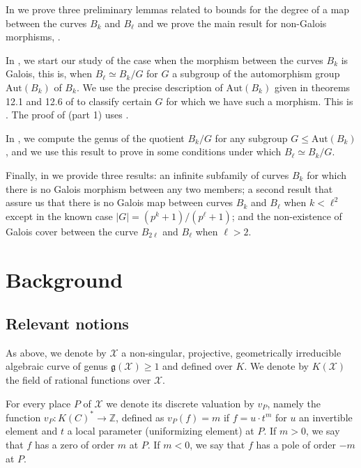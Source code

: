 \documentclass[oneside,a4paper,12pt]{article}
\newcommand{\Z}{{\mathbb{Z}}} %
\theoremstyle{plain} %
\theoremstyle{definition} %
\newcommand{\Aut}{\mathrm{Aut}}
\begin{document}
In  we prove three preliminary lemmas related to bounds for the degree of a map between the curves $B_k$ and $B_\ell$ and we prove the main result for non-Galois morphisms,  .

In , we start our study of the case when the morphism between the curves $B_k$ is Galois, this is, when $B_\ell \simeq B_k/G$ for $G$ a subgroup of the automorphism group $\Aut(B_k)$ of $B_k$.
We use the precise description of $\Aut(B_k)$ given in theorems 12.1 and 12.6 of \cite{HKT}  to classify certain $G$ for which we have such a morphism. 
This is  .
The proof of  (part 1) uses .

In , we compute the genus of the quotient $B_k/G$ for any subgroup $G\leq \Aut(B_k)$, and we use this result to prove in  some conditions under which $B_\ell \simeq B_k/G$. 

Finally, in  we provide three results: an infinite subfamily of curves $B_k$ for which there is no Galois morphism between any two members; a second result that assure us that there is no Galois map between curves $B_k$ and $B_\ell$ when $k< \ell^2$ except in the known case $|G|=(p^k+1)/(p^\ell+1)$; and the non-existence of Galois cover between the curve $B_{2\ell}$ and $B_\ell$ when $\ell>2$.



\section{Background}\label{backg}

\subsection{Relevant notions}
As above, we denote by $\mathcal{X}$ a non-singular, projective, geometrically irreducible algebraic curve of genus $\mathfrak{g}(\mathcal{X})\geq 1$ and defined over $K$.
We denote by $K(\mathcal{X})$ the field of rational functions over $\mathcal{X}$.

For every place $P$ of $\mathcal{X}$ we denote its discrete valuation by $v_P$, namely the function $v_P: K(C)^* \longrightarrow \Z$, defined as $v_P(f)=m$ if $f= u \cdot t^m$ for $u$ an invertible element and $t$ a local parameter (uniformizing element) at $P$. If $m>0$, we say that $f$ has a zero of order $m$ at $P$.  If $m<0$, we say that $f$ has a pole of order $-m$ at $P$.
\end{document}

